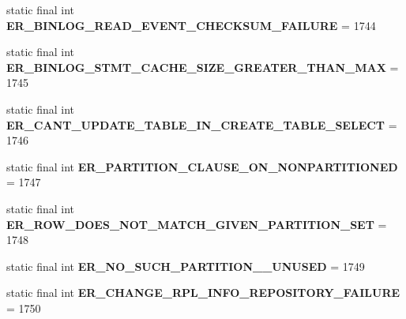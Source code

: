 \begin{DoxyCompactItemize}
static final int {\bfseries E\+R\+\_\+\+B\+I\+N\+L\+O\+G\+\_\+\+R\+E\+A\+D\+\_\+\+E\+V\+E\+N\+T\+\_\+\+C\+H\+E\+C\+K\+S\+U\+M\+\_\+\+F\+A\+I\+L\+U\+RE} = 1744
\item 
\mbox{\label{classcom_1_1mysql_1_1jdbc_1_1_mysql_error_numbers_a0af3e800b084dc1708ae81fb922ec61e}} 
static final int {\bfseries E\+R\+\_\+\+B\+I\+N\+L\+O\+G\+\_\+\+S\+T\+M\+T\+\_\+\+C\+A\+C\+H\+E\+\_\+\+S\+I\+Z\+E\+\_\+\+G\+R\+E\+A\+T\+E\+R\+\_\+\+T\+H\+A\+N\+\_\+\+M\+AX} = 1745
\item 
\mbox{\label{classcom_1_1mysql_1_1jdbc_1_1_mysql_error_numbers_ad08446cf38fc5e9345ee105a496e26e2}} 
static final int {\bfseries E\+R\+\_\+\+C\+A\+N\+T\+\_\+\+U\+P\+D\+A\+T\+E\+\_\+\+T\+A\+B\+L\+E\+\_\+\+I\+N\+\_\+\+C\+R\+E\+A\+T\+E\+\_\+\+T\+A\+B\+L\+E\+\_\+\+S\+E\+L\+E\+CT} = 1746
\item 
\mbox{\label{classcom_1_1mysql_1_1jdbc_1_1_mysql_error_numbers_ae1b11c80d40dfda5e01d492bf806a921}} 
static final int {\bfseries E\+R\+\_\+\+P\+A\+R\+T\+I\+T\+I\+O\+N\+\_\+\+C\+L\+A\+U\+S\+E\+\_\+\+O\+N\+\_\+\+N\+O\+N\+P\+A\+R\+T\+I\+T\+I\+O\+N\+ED} = 1747
\item 
\mbox{\label{classcom_1_1mysql_1_1jdbc_1_1_mysql_error_numbers_aa219e6ba13a983509274e4ab2f36b03d}} 
static final int {\bfseries E\+R\+\_\+\+R\+O\+W\+\_\+\+D\+O\+E\+S\+\_\+\+N\+O\+T\+\_\+\+M\+A\+T\+C\+H\+\_\+\+G\+I\+V\+E\+N\+\_\+\+P\+A\+R\+T\+I\+T\+I\+O\+N\+\_\+\+S\+ET} = 1748
\item 
\mbox{\label{classcom_1_1mysql_1_1jdbc_1_1_mysql_error_numbers_a64f8b4a696ddcb06643c98488c5b7276}} 
static final int {\bfseries E\+R\+\_\+\+N\+O\+\_\+\+S\+U\+C\+H\+\_\+\+P\+A\+R\+T\+I\+T\+I\+O\+N\+\_\+\+\_\+\+U\+N\+U\+S\+ED} = 1749
\item 
\mbox{\label{classcom_1_1mysql_1_1jdbc_1_1_mysql_error_numbers_a35df61f851f967522c3b29191f5bddea}} 
static final int {\bfseries E\+R\+\_\+\+C\+H\+A\+N\+G\+E\+\_\+\+R\+P\+L\+\_\+\+I\+N\+F\+O\+\_\+\+R\+E\+P\+O\+S\+I\+T\+O\+R\+Y\+\_\+\+F\+A\+I\+L\+U\+RE} = 1750

\end{DoxyCompactItemize}
